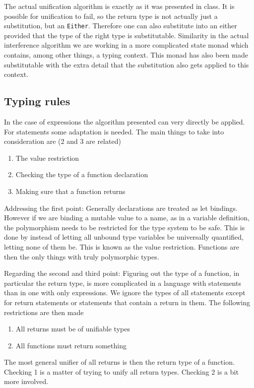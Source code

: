 \documentclass{scrartcl}
\begin{document}
The actual unification algorithm is exactly as it was presented in
class. It is possible for unification to fail, so the return type
is not actually just a substitution, but an \lstinline{Either}.
Therefore one can also substitute into an either provided that the
type of the right type is substitutable. Similarity in the actual
interference algorithm we are working in a more complicated state
monad which contains, among other things, a typing context.
This monad has also been made
substitutable with the extra detail that the substitution also gets
applied to this context.

\subsection{Typing rules}
In the case of expressions the algorithm presented can very directly
be applied. For statements some adaptation is needed. The main
things to take into consideration are (2 and 3 are related)
\begin{enumerate}
\item The value restriction
\item Checking the type of a function declaration
\item Making sure that a function returns
\end{enumerate}
Addressing the first point: Generally declarations are treated as let
bindings. However if we are binding a mutable value to a name, as in
a variable definition, the polymorphism needs to be restricted for 
the type system to be safe. This is done by instead of letting all
unbound type variables be universally quantified, letting none of them
be. This is known as the value restriction. Functions are then the
only things with truly polymorphic types.

Regarding the second and third point: Figuring out the type of a 
function, in particular the return type, is more complicated in a
language with statements than in one with only expressions. We 
ignore the types of all statements except for return statements or
statements that contain a return in them. The following restrictions
are then made
\begin{enumerate}
\item All returns must be of unifiable types
\item All functions must return something
\end{enumerate}
The most general unifier of all returns is then the return type of
a function. Checking 1 is a matter of trying to unify all return
types. Checking 2 is a bit more involved.
\end{document}
